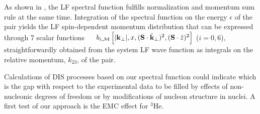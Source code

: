 { As shown in \cite{LFSF}, the LF
 spectral function  
fulfills {normalization and momentum sum rule  at the same time. Integration of the spectral function on the energy 
$\epsilon$ 
of the pair yields the LF spin-dependent momentum distribution that
can  be expressed through 7 scalar functions ~~ {{${b}_{i,{\cal M}}\left [ |{\bf k}_{\perp}|,x,({\bf  S}\cdot \hat {\bf k}_{\perp})^2,({\bf  S} \cdot {\hat z})^2 \right] $}}} ($i=0,6$), straightforwardly obtained from the system LF wave function as integrals on the relative momentum, $k_{23}$, of the pair.

{{Calculations of DIS 
 processes  based on our spectral function could indicate which is the gap with respect to the experimental data to be filled by effects of non-nucleonic degrees of freedom or by modifications of nucleon structure in nuclei.}}
 {A first test of our approach is the EMC effect for $^3\mathrm{He}$.} 

}
